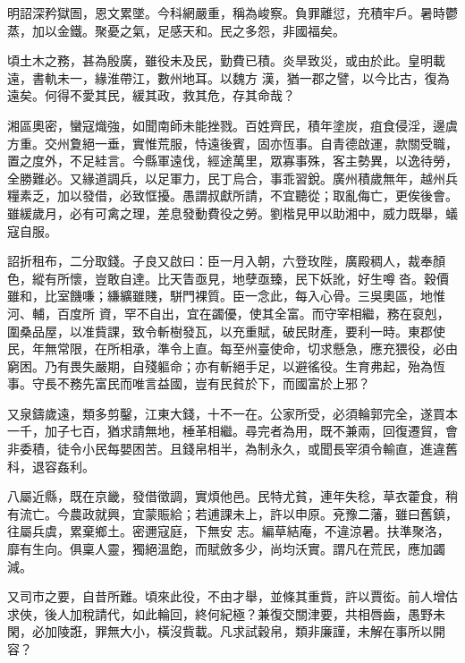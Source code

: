\begin{pinyinscope}
 明詔深矜獄圄，恩文累墜。今科網嚴重，稱為峻察。負罪離愆，充積牢戶。暑時鬱蒸，加以金鐵。聚憂之氣，足感天和。民之多怨，非國福矣。



 頃土木之務，甚為殷廣，雖役未及民，勤費已積。炎旱致災，或由於此。皇明載遠，書軌未一，緣淮帶江，數州地耳。以魏方
 漢，猶一郡之譬，以今比古，復為遠矣。何得不愛其民，緩其政，救其危，存其命哉？



 湘區奧密，蠻寇熾強，如聞南師未能挫戮。百姓齊民，積年塗炭，疽食侵淫，邊虞方重。交州夐絕一垂，實惟荒服，恃遠後賓，固亦恆事。自青德啟運，款關受職，置之度外，不足絓言。今縣軍遠伐，經途萬里，眾寡事殊，客主勢異，以逸待勞，全勝難必。又緣道調兵，以足軍力，民丁烏合，事乖習銳。廣州積歲無年，越州兵糧素乏，加以發借，必致恇擾。愚謂叔獻所請，不宜聽從；取亂侮亡，更俟後會。雖緩歲月，必有可禽之理，差息發動費役之勞。劉楷見甲以助湘中，威力既舉，蟻寇自服。



 詔折租布，二分取錢。子良又啟曰：臣一月入朝，六登玫陛，廣殿稠人，裁奉顏色，縱有所懷，豈敢自達。比天眚亟見，地孽亟臻，民下妖訛，好生噂沓。穀價雖和，比室饑嗛；縑纊雖賤，駢門裸質。臣一念此，每入心骨。三吳奧區，地惟河、輔，百度所
 資，罕不自出，宜在蠲優，使其全富。而守宰相繼，務在裒剋，圍桑品屋，以准貲課，致令斬樹發瓦，以充重賦，破民財產，要利一時。東郡使民，年無常限，在所相承，準令上直。每至州臺使命，切求懸急，應充猥役，必由窮困。乃有畏失嚴期，自殘軀命；亦有斬絕手足，以避徭役。生育弗起，殆為恆事。守長不務先富民而唯言益國，豈有民貧於下，而國富於上邪？



 又泉鑄歲遠，類多剪鑿，江東大錢，十不一在。公家所受，必須輪郭完全，遂買本一千，加子七百，猶求請無地，棰革相繼。尋完者為用，既不兼兩，回復遷貿，會非委積，徒令小民每嬰困苦。且錢帛相半，為制永久，或聞長宰須令輸直，進違舊科，退容姦利。



 八屬近縣，既在京畿，發借徵調，實煩他邑。民特尤貧，連年失稔，草衣藿食，稍有流亡。今農政就興，宜蒙賑給；若逋課未上，許以申原。兗豫二藩，雖曰舊鎮，往屬兵虞，累棄鄉土。密邇寇庭，下無安
 志。編草結庵，不違涼暑。扶準聚洛，靡有生向。俱稟人靈，獨絕溫飽，而賦斂多少，尚均沃實。謂凡在荒民，應加蠲減。



 又司市之要，自昔所難。頃來此役，不由才舉，並條其重貲，許以賈衒。前人增估求俠，後人加稅請代，如此輪回，終何紀極？兼復交關津要，共相唇齒，愚野未閑，必加陵誑，罪無大小，橫沒貲載。凡求試穀帛，類非廉謹，未解在事所以開容？




\end{pinyinscope}
